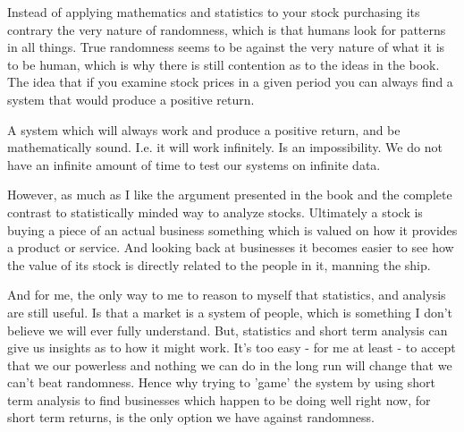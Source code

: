 \documentclass[12pt]{article}
\begin{document}
    Instead of applying mathematics and statistics to your stock purchasing its contrary the 
    very nature of randomness, which is that humans look for patterns in all things. True 
    randomness seems to be against the very nature of what it is to be human, which is why
    there is still contention as to the ideas in the book. The idea that if you examine stock
    prices in a given period you can always find a system that would produce a positive return.

    A system which will always work and produce a positive return, and be mathematically sound. 
    I.e. it will work infinitely. Is an impossibility. We do not have an infinite amount of
    time to test our systems on infinite data.

    However, as much as I like the argument presented in the book and the complete contrast to 
    statistically minded way to analyze stocks. Ultimately a stock is buying a piece of an 
    actual business something which is valued on how it provides a product or service. And 
    looking back at businesses it becomes easier to see how the value of its stock is directly 
    related to the people in it, manning the ship.

    And for me, the only way to me to reason to myself that statistics, and analysis are still 
    useful. Is that a market is a system of people, which is something I don't believe we will 
    ever fully understand. But, statistics and short term analysis can give us insights as to 
    how it might work. It's too easy - for me at least - to accept that we our powerless and 
    nothing we can do in the long run will change that we can't beat randomness. Hence why
    trying to 'game' the system by using short term analysis to find businesses which happen
    to be doing well right now, for short term returns, is the only option we have against
    randomness.

\pagebreak


\end{document}
